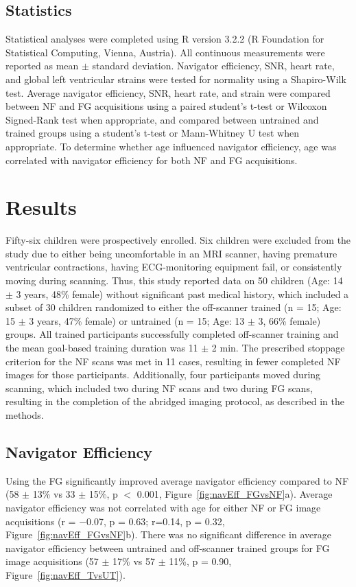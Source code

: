 \subsection{Statistics}
	Statistical analyses were completed using R version 3.2.2 (R Foundation for Statistical Computing, Vienna, Austria). All continuous measurements were reported as mean $\pm$ standard deviation. Navigator efficiency, SNR, heart rate, and global left ventricular strains were tested for normality using a Shapiro-Wilk test. Average navigator efficiency, SNR, heart rate, and strain were compared between NF and FG acquisitions using a paired student's t-test or Wilcoxon Signed-Rank test when appropriate, and compared between untrained and trained groups using a student's t-test or Mann-Whitney U test when appropriate. To determine whether age influenced navigator efficiency, age was correlated with navigator efficiency for both NF and FG acquisitions.
	
\section{Results}
	Fifty-six children were prospectively enrolled. Six children were excluded from the study due to either being uncomfortable in an MRI scanner, having premature ventricular contractions, having ECG-monitoring equipment fail, or consistently moving during scanning. Thus, this study reported data on 50 children (Age: 14 $\pm$ 3 years, 48\% female) without significant past medical history, which included a subset of 30 children randomized to either the off-scanner trained (n = 15; Age: 15 $\pm$ 3 years, 47\% female) or untrained (n = 15; Age: 13 $\pm$ 3, 66\% female) groups. All trained participants successfully completed off-scanner training and the mean goal-based training duration was 11 $\pm$ 2 min. The prescribed stoppage criterion for the NF scans was met in 11 cases, resulting in fewer completed NF images for those participants. Additionally, four participants moved during scanning, which included two during NF scans and two during FG scans, resulting in the completion of the abridged imaging protocol, as described in the methods.

\subsection{Navigator Efficiency}
	Using the FG significantly improved average navigator efficiency compared to NF (58 $\pm$ 13\% vs 33 $\pm$ 15\%, p $<$ 0.001, Figure~\ref{fig:navEff_FGvsNF}a). Average navigator efficiency was not correlated with age for either NF or FG image acquisitions (r = −0.07, p = 0.63; r=0.14, p = 0.32, Figure~\ref{fig:navEff_FGvsNF}b). There was no significant difference in average navigator efficiency between untrained and off-scanner trained groups for FG image acquisitions (57 $\pm$ 17\% vs 57 $\pm$ 11\%, p = 0.90, Figure~\ref{fig:navEff_TvsUT}).
	
